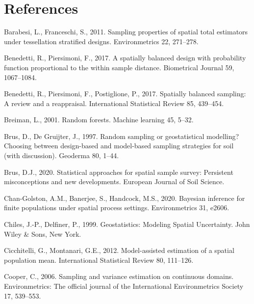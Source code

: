\documentclass[]{elsarticle} %
\begin{document}
\hypertarget{references}{%
\section*{References}\label{references}}

\hypertarget{refs}{}
\leavevmode\hypertarget{ref-barabesi2011sampling}{}%
Barabesi, L., Franceschi, S., 2011. Sampling properties of spatial total
estimators under tessellation stratified designs. Environmetrics 22,
271--278.

\leavevmode\hypertarget{ref-benedetti2017spatially}{}%
Benedetti, R., Piersimoni, F., 2017. A spatially balanced design with
probability function proportional to the within sample distance.
Biometrical Journal 59, 1067--1084.

\leavevmode\hypertarget{ref-benedetti2017spatiallyreview}{}%
Benedetti, R., Piersimoni, F., Postiglione, P., 2017. Spatially balanced
sampling: A review and a reappraisal. International Statistical Review
85, 439--454.

\leavevmode\hypertarget{ref-breiman2001random}{}%
Breiman, L., 2001. Random forests. Machine learning 45, 5--32.

\leavevmode\hypertarget{ref-brus1997random}{}%
Brus, D., De Gruijter, J., 1997. Random sampling or geostatistical
modelling? Choosing between design-based and model-based sampling
strategies for soil (with discussion). Geoderma 80, 1--44.

\leavevmode\hypertarget{ref-brus2020statistical}{}%
Brus, D.J., 2020. Statistical approaches for spatial sample survey:
Persistent misconceptions and new developments. European Journal of Soil
Science.

\leavevmode\hypertarget{ref-chan2020bayesian}{}%
Chan-Golston, A.M., Banerjee, S., Handcock, M.S., 2020. Bayesian
inference for finite populations under spatial process settings.
Environmetrics 31, e2606.

\leavevmode\hypertarget{ref-chiles1999geostatistics}{}%
Chiles, J.-P., Delfiner, P., 1999. Geostatistics: Modeling Spatial
Uncertainty. John Wiley \& Sons, New York.

\leavevmode\hypertarget{ref-cicchitelli2012model}{}%
Cicchitelli, G., Montanari, G.E., 2012. Model-assisted estimation of a
spatial population mean. International Statistical Review 80, 111--126.

\leavevmode\hypertarget{ref-cooper2006sampling}{}%
Cooper, C., 2006. Sampling and variance estimation on continuous
domains. Environmetrics: The official journal of the International
Environmetrics Society 17, 539--553.
\end{document}

